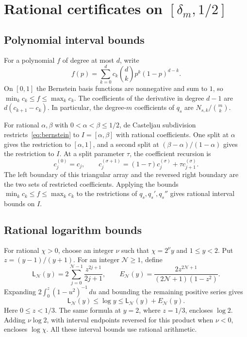 \documentclass[11pt,a4paper]{article}
\numberwithin{equation}{section}
\theoremstyle{remark}
\begin{document}
\section{Rational certificates on \texorpdfstring{$[\delta_m,1/2]$}{[delta\_m,1/2]}}\label{sec:certificates}

\subsection{Polynomial interval bounds}\label{sec:bernstein}

For a polynomial $f$ of degree at most $d$, write
\begin{equation}\label{eq:bernstein}
 f(p)=\sum_{k=0}^d c_k\binom dk p^k(1-p)^{d-k}.
\end{equation}
On $[0,1]$ the Bernstein basis functions are nonnegative and sum to $1$, so $\min_k c_k\le f\le\max_k c_k$. The coefficients of the derivative in degree $d-1$ are $d(c_{k+1}-c_k)$. In particular, the degree-$m$ coefficients of $q_s$ are $N_{s,k}/\binom mk$.

For rational $\alpha,\beta$ with $0<\alpha<\beta\le1/2$, de Casteljau subdivision~\cite{Farouki} restricts~\eqref{eq:bernstein} to $I=[\alpha,\beta]$ with rational coefficients. One split at $\alpha$ gives the restriction to $[\alpha,1]$, and a second split at $(\beta-\alpha)/(1-\alpha)$ gives the restriction to $I$. At a split parameter $\tau$, the coefficient recursion is
\[
 c_j^{(0)}=c_j,\qquad
 c_j^{(\sigma+1)}=(1-\tau)c_j^{(\sigma)}+\tau c_{j+1}^{(\sigma)}.
\]
The left boundary of this triangular array and the reversed right boundary are the two sets of restricted coefficients. Applying the bounds $\min_kc_k\le f\le\max_kc_k$ to the restrictions of $q_s,q_s',q_s''$ gives rational interval bounds on $I$.

\subsection{Rational logarithm bounds}\label{sec:logs}

For rational $\chi>0$, choose an integer $\nu$ such that $\chi=2^\nu y$ and $1\le y<2$. Put $z=(y-1)/(y+1)$. For an integer $\mathcal N\ge1$, define
\begin{equation}\label{eq:log}
 \mathsf L_{\mathcal N}(y)=2\sum_{j=0}^{\mathcal N-1}\frac{z^{2j+1}}{2j+1},\qquad
 E_{\mathcal N}(y)=\frac{2z^{2\mathcal N+1}}{(2\mathcal N+1)(1-z^2)}.
\end{equation}
Expanding $2\int_0^z(1-u^2)^{-1}\,du$ and bounding the remaining positive series gives
\[
 \mathsf L_{\mathcal N}(y)\le\log y\le \mathsf L_{\mathcal N}(y)+E_{\mathcal N}(y).
\]
Here $0\le z<1/3$. The same formula at $y=2$, where $z=1/3$, encloses $\log2$. Adding $\nu\log2$, with interval endpoints reversed for this product when $\nu<0$, encloses $\log \chi$. All these interval bounds use rational arithmetic.
\end{document}
